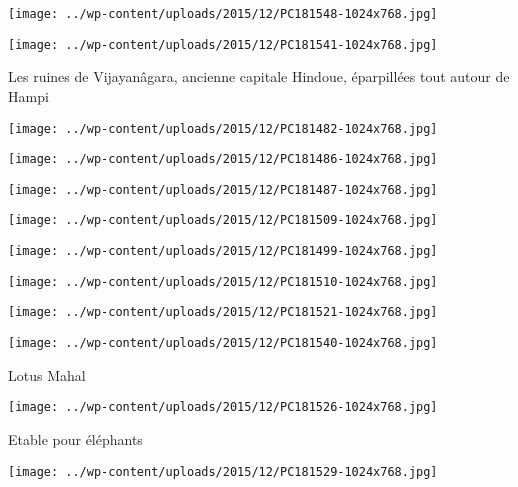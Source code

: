  \newline
\centerline{\texttt{[image: ../wp-content/uploads/2015/12/PC181548-1024x768.jpg]} } 
 \newline
 \newline
\centerline{\texttt{[image: ../wp-content/uploads/2015/12/PC181541-1024x768.jpg]} } 
 \newline
 Les ruines de Vijayanâgara, ancienne capitale Hindoue, éparpillées tout autour de Hampi \newline
 \newline
\centerline{\texttt{[image: ../wp-content/uploads/2015/12/PC181482-1024x768.jpg]} } 
 \newline
 \newline
\centerline{\texttt{[image: ../wp-content/uploads/2015/12/PC181486-1024x768.jpg]} } 
 \newline
 \newline
\centerline{\texttt{[image: ../wp-content/uploads/2015/12/PC181487-1024x768.jpg]} } 
 \newline
 \newline
\centerline{\texttt{[image: ../wp-content/uploads/2015/12/PC181509-1024x768.jpg]} } 
 \newline
 \newline
\centerline{\texttt{[image: ../wp-content/uploads/2015/12/PC181499-1024x768.jpg]} } 
 \newline
 \newline
\centerline{\texttt{[image: ../wp-content/uploads/2015/12/PC181510-1024x768.jpg]} } 
 \newline
 \newline
\centerline{\texttt{[image: ../wp-content/uploads/2015/12/PC181521-1024x768.jpg]} } 
 \newline
 \newline
\centerline{\texttt{[image: ../wp-content/uploads/2015/12/PC181540-1024x768.jpg]} } 
 \newline
 Lotus Mahal \newline
 \newline
\centerline{\texttt{[image: ../wp-content/uploads/2015/12/PC181526-1024x768.jpg]} } 
 \newline
 Etable pour éléphants \newline
 \newline
\centerline{\texttt{[image: ../wp-content/uploads/2015/12/PC181529-1024x768.jpg]} } 
